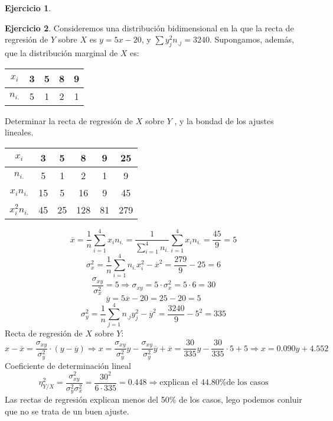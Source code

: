 \documentclass[a4paper, 12pt]{article}
\theoremstyle{definition}
\newtheorem{ej}{Ejercicio}
\begin{document}
\begin{ej}
\end{ej}

\begin{ej}
Consideremos una distribución bidimensional en la que la recta de regresión de $Y$ sobre $X$ es $y=5x-20$, y $\sum y_j^2n_{.j} = 3240$. Supongamos, además, que la distribución marginal de $X$ es:

\begin{center}
\begin{tabular}{c|cccc}
    $x_i$ & 3 & 5 & 8 & 9 \\
    \hline
    $n_{i.}$ & 5 & 1 & 2 & 1 
\end{tabular}
\end{center}

Determinar la recta de regresión de $X$ sobre $Y$ , y la bondad de los ajustes lineales.

\begin{center}
\begin{tabular}{c|cccc|c}
    $x_i$ & 3 & 5 & 8 & 9 & 25 \\
    \hline
    $n_{i.}$ & 5 & 1 & 2 & 1 & 9\\
    \hline
    $x_in_{i.}$ & 15 &  5 & 16 & 9 & 45 \\
    \hline
    $x_i^2n_{i.}$ & 45 & 25 & 128 & 81 & 279 \\
\end{tabular}
\end{center}

\[
\overline{x} = \frac{1}{n}\sum_{i=1}^4x_in_{i.}= \frac{1}{\sum^4_{i=1}n_{i.}}\sum_{i=1}^4x_in_{i.}=\frac{45}{9} = 5
\]
\[
\sigma_x^2 = \frac{1}{n}\sum_{i=1}^4n_{i.}x_i^2 - \overline{x}^2 = \frac{279}{9} -25 = 6
\]
\[
\frac{\sigma_{xy}}{\sigma_x^2}=5 \Longrightarrow \sigma_{xy} = 5 \cdot\sigma_x^2= 5\cdot 6 = 30
\]
\[
\overline{y}=5\overline{x} -20 = 25-20 = 5
\]
\[
\sigma_y^2 = \frac{1}{n}\sum_{j=1}^4n_{.j}y_j^2 -\overline{y}^2 = \frac{3240}{9}-5^2 = 335
\]
Recta de regresión de $X$ sobre $Y$:
\[
x - \overline{x} = \frac{\sigma_{xy}}{\sigma_{y}^2} \cdot (y - \overline{y}) \Longrightarrow x=\frac{\sigma_{xy}}{\sigma_y^2}y-\frac{\sigma_{xy}}{\sigma_y^2}\overline{y}+\overline{x}= \frac{30}{335}y-\frac{30}{335}\cdot 5 + 5 \Longrightarrow x = 0.090y + 4.552
\]
Coeficiente de determinación lineal
\[
\eta_{Y/X}^{2} = \frac{\sigma_{xy}^2}{\sigma_y^2\sigma_x^2} = \frac{30^2}{6\cdot 335} = 0.448 \Longrightarrow \text{explican el 44.80\% de los casos}
\]
Las rectas de regresión explican menos del 50\% de los casos, lego podemos conluir que no se trata de un buen ajuste.

\end{ej}
\end{document}

